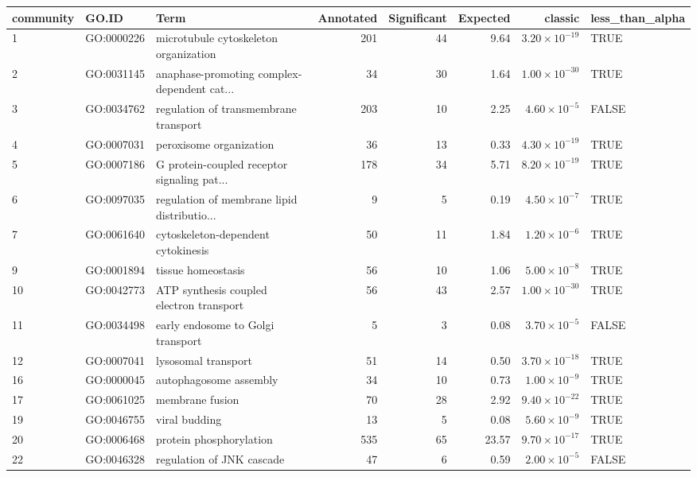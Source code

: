 \begin{table}[ht]
\centering
\begin{adjustbox}{max width=\textwidth}
\begin{tabular}{lllrrrrl}
  \hline
community & GO.ID & Term & Annotated & Significant & Expected & classic & less\_than\_alpha \\ 
  \hline
1 & GO:0000226 & microtubule cytoskeleton organization & 201 & 44 & 9.64 & $3.20 \times 10^{-19}$ & TRUE \\ 
  2 & GO:0031145 & anaphase-promoting complex-dependent cat... & 34 & 30 & 1.64 & $1.00 \times 10^{-30}$ & TRUE \\ 
  3 & GO:0034762 & regulation of transmembrane transport & 203 & 10 & 2.25 & $4.60 \times 10^{-5}$ & FALSE \\ 
  4 & GO:0007031 & peroxisome organization & 36 & 13 & 0.33 & $4.30 \times 10^{-19}$ & TRUE \\ 
  5 & GO:0007186 & G protein-coupled receptor signaling pat... & 178 & 34 & 5.71 & $8.20 \times 10^{-19}$ & TRUE \\ 
  6 & GO:0097035 & regulation of membrane lipid distributio... & 9 & 5 & 0.19 & $4.50 \times 10^{-7}$ & TRUE \\ 
  7 & GO:0061640 & cytoskeleton-dependent cytokinesis & 50 & 11 & 1.84 & $1.20 \times 10^{-6}$ & TRUE \\ 
  9 & GO:0001894 & tissue homeostasis & 56 & 10 & 1.06 & $5.00 \times 10^{-8}$ & TRUE \\ 
  10 & GO:0042773 & ATP synthesis coupled electron transport & 56 & 43 & 2.57 & $1.00 \times 10^{-30}$ & TRUE \\ 
  11 & GO:0034498 & early endosome to Golgi transport & 5 & 3 & 0.08 & $3.70 \times 10^{-5}$ & FALSE \\ 
  12 & GO:0007041 & lysosomal transport & 51 & 14 & 0.50 & $3.70 \times 10^{-18}$ & TRUE \\ 
  16 & GO:0000045 & autophagosome assembly & 34 & 10 & 0.73 & $1.00 \times 10^{-9}$ & TRUE \\ 
  17 & GO:0061025 & membrane fusion & 70 & 28 & 2.92 & $9.40 \times 10^{-22}$ & TRUE \\ 
  19 & GO:0046755 & viral budding & 13 & 5 & 0.08 & $5.60 \times 10^{-9}$ & TRUE \\ 
  20 & GO:0006468 & protein phosphorylation & 535 & 65 & 23.57 & $9.70 \times 10^{-17}$ & TRUE \\ 
  22 & GO:0046328 & regulation of JNK cascade & 47 & 6 & 0.59 & $2.00 \times 10^{-5}$ & FALSE \\ 

\end{tabular}
\end{adjustbox}
\end{table}
